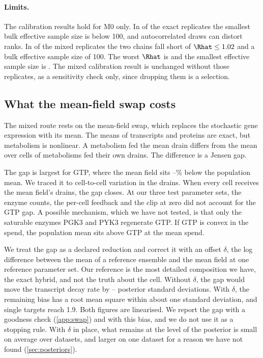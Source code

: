\paragraph{Limits.} The calibration results hold for M0 only. In 
of the  exact replicates the smallest bulk effective sample size is below 100, and autocorrelated draws can distort ranks. In  of the  mixed replicates the two chains
fall short of $\Rhat \le 1.02$ and a bulk effective sample size of 100. The worst
$\Rhat$ is  and the smallest effective sample size is . The
mixed calibration result is unchanged without those replicates, as a sensitivity check only, since dropping them is a selection.

\subsection{What the mean-field swap costs}
\label{sec:jensen}

The mixed route rests on the mean-field swap, which replaces the stochastic gene expression with its mean. The
means of transcripts and proteins are exact, but metabolism is nonlinear. A
metabolism fed the mean drain differs from the mean over cells of metabolisms fed
their own drains. The difference is a Jensen gap.

The gap is largest for GTP, where the mean field sits
--\% below the population mean. We traced it to
cell-to-cell variation in the drains. When every cell receives the mean field's
drains, the gap closes. At our three test parameter sets, the enzyme counts, the per-cell feedback and the clip at zero did not account for the GTP gap. A possible mechanism, which we have not tested, is that only the saturable enzymes PGK3 and PYK3 regenerate GTP. If GTP is convex in the spend, the population mean sits above GTP at the mean spend.

We treat the gap as a declared reduction and correct it
with an offset $\delta$, the log difference between the mean of a reference
ensemble and the mean field at one reference parameter set. Our reference is the
most detailed composition we have, the exact hybrid, and not the truth about the
cell. Without $\delta$, the gap would move the transcript decay rate by
-- posterior standard deviations. With $\delta$, the remaining bias has a root mean square within about one standard deviation, and single targets reach 1.9. Both figures are linearised. We report the gap with a goodness check (\cref{app:swap}) and with this bias, and we do not use it as a stopping rule. With $\delta$ in place, what remains at the level of the posterior is small on
average over datasets, and larger on one dataset for a reason we have not found
(\cref{sec:posteriors}).

